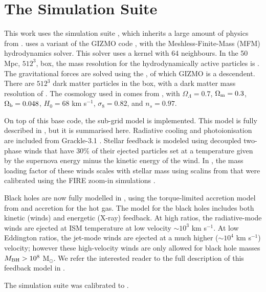 \section{The \simba{} Simulation Suite}
\label{sec:simba}

This work uses the \simba{} simulation suite \citep{}, which inherits a large
amount of physics from \mufasa{} \citep{dave2016}. \simba{} uses a variant of the
GIZMO code \citep{hopkins2015}, with the Meshless-Finite-Mass (MFM)
hydrodynamics solver. This solver uses a  kernel with 64
neighbours. In the 50 Mpc, $512^3$, box, the mass resolution for the
hydrodynamically active particles is . The gravitational
forces are solved using the , of which GIZMO is a descendent. There are $512^3$ dark
matter particles in the box, with a dark matter mass resolution of . The cosmology used in \simba{} comes from \citet{planck2016}, with
$\Omega_\Lambda = 0.7$, $\Omega_{\rm m} = 0.3$, $\Omega_{\rm b} = 0.048$, $H_0
= 68$ km s$^{-1}$, $\sigma_8=0.82$, and $n_s=0.97$.

On top of this base code, the \simba{} sub-grid model is implemented. This model
is fully described in \citet{}, but it is summarised here. Radiative cooling
and photoionisation are included from Grackle-3.1 \citep{}. Stellar feedback is
modeled using decoupled two-phase winds that have 30\% of their ejected
particles set at a temperature given by the supernova energy minus the kinetic
energy of the wind. In \simba{}, the mass loading factor of these winds scales
with stellar mass using scalins from \citet{muratov2015} that were calibrated
using the FIRE zoom-in simulations \citep{}.

Black holes are now fully modelled in \simba{}, using the torque-limited
accretion model from \citet{anglesalcazar2017} and \citet{bondi29832} accretion
for the hot gas. The model for the black holes includes both kinetic (winds)
and energetic (X-ray) feedback. At high \citet{eddington} ratios, the
radiative-mode winds are ejected at ISM temperature at low velocity $\sim 10^3$
km s$^{-1}$. At low Eddington ratios, the jet-mode winds are ejected at a much
higher ($\sim 10^4$ km s$^{-1}$) velocity; however these high-velocity winds
are only allowed for black hole masses $M_{\rm BH} > 10^8$ M$_\odot$. We refer
the interested reader to the full description of this feedback model in
\citet{dave2018}.

The \simba{} simulation suite was calibrated to .

